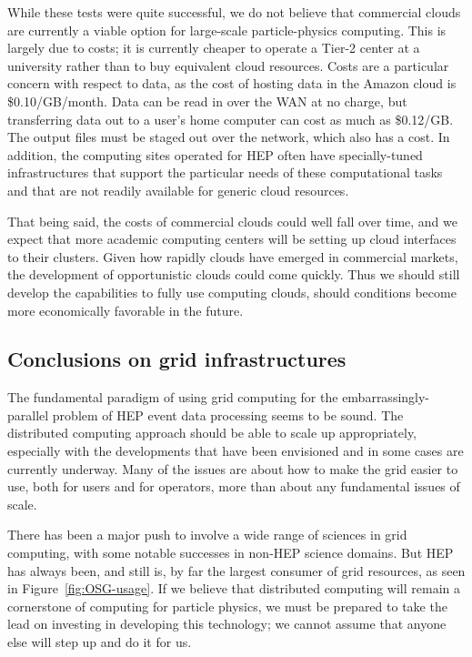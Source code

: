 While these tests were quite successful, we do not believe that commercial clouds are currently a viable option for large-scale particle-physics computing.  This is largely due to costs; it is currently cheaper to operate a Tier-2 center at a university rather than to buy equivalent cloud resources.  Costs are a particular concern with respect to data, as the cost of hosting data in the Amazon cloud is \$0.10/GB/month.  Data can be read in over the WAN at no charge, but transferring data out to a user’s home computer can cost as much as \$0.12/GB.   The output files must be staged out over the network, which also has a cost.  In addition, the computing sites operated for HEP often have specially-tuned infrastructures that support the particular needs of these computational tasks and that are not readily available for generic cloud resources.

That being said, the costs of commercial clouds could well fall over time, and we expect that more academic computing centers will be setting up cloud interfaces to their clusters.  Given how rapidly clouds have emerged in commercial markets, the development of opportunistic clouds could come quickly.  Thus we should still develop the capabilities to fully use computing clouds, should conditions become more economically favorable in the future.

\subsection{Conclusions on grid infrastructures}

The fundamental paradigm of using grid computing for the embarrassingly-parallel problem of HEP event data processing seems to be sound.  The distributed computing approach should be able to scale up appropriately, especially with the developments that have been envisioned and in some cases are currently underway.  Many of the issues are about how to make the grid easier to use, both for users and for operators, more than about any fundamental issues of scale.

There has been a major push to involve a wide range of sciences in grid computing, with some notable successes in non-HEP science domains.  But HEP has always been, and still is, by far the largest consumer of grid resources, as seen in Figure~\ref{fig:OSG-usage}.  If we believe that distributed computing will remain a cornerstone of computing for particle physics, we must be prepared to take the lead on investing in developing this technology; we cannot assume that anyone else will step up and do it for us.

